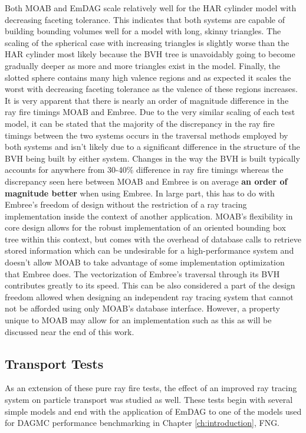 Both MOAB and EmDAG scale relatively well for the HAR cylinder model with
decreasing faceting tolerance. This indicates that both systems are capable of
building bounding volumes well for a model with long, skinny triangles. The
scaling of the spherical case with increasing triangles is slightly worse than
the HAR cylinder most likely because the BVH tree is unavoidably going to
become gradually deeper as more and more triangles exist in the model. Finally,
the slotted sphere contains many high valence regions and as expected it scales
the worst with decreasing faceting tolerance as the valence of these regions
increases. It is very apparent that there is nearly an order of magnitude
difference in the ray fire timings MOAB and Embree. Due to the very similar
scaling of each test model, it can be stated that the majority of the
discrepancy in the ray fire timings between the two systems occurs in the
traversal methods employed by both systems and isn't likely due to a significant
difference in the structure of the BVH being built by either system. Changes in
the way the BVH is built typically accounts for anywhere from 30-40\% difference
in ray fire timings whereas the discrepancy seen here between MOAB and Embree is
on average \textbf{an order of magnitude better} when using Embree. In large
part, this has to do with Embree's freedom of design without the restriction of
a ray tracing implementation inside the context of another application. MOAB's
flexibility in core design allows for the robust implementation of an oriented
bounding box tree within this context, but comes with the overhead of database
calls to retrieve stored information which can be undesirable for a
high-performance system and doesn't allow MOAB to take advantage of some
implementation optimization that Embree does. The vectorization of Embree's
traversal through its BVH contributes greatly to its speed. This can be also
considered a part of the design freedom allowed when designing an independent
ray tracing system that cannot not be afforded using only MOAB's database
interface. However, a property unique to MOAB may allow for an implementation
such as this as will be discussed near the end of this work.

\subsection{Transport Tests}
\label{subsec:emdag_transport}

As an extension of these pure ray fire tests, the effect of an improved ray
tracing system on particle transport was studied as well. These tests begin with
several simple models and end with the application of EmDAG to one of the models
used for DAGMC performance benchmarking in Chapter \ref{ch:introduction}, FNG.

